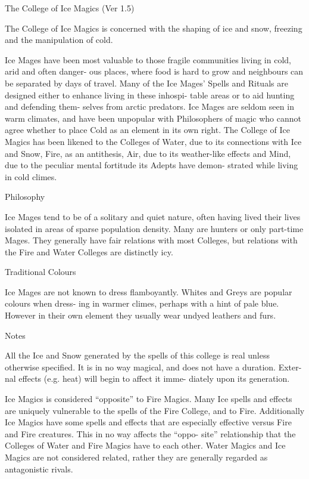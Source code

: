\begin{Chapter}{The College of Ice Magics (Ver 1.5)}

The College of Ice Magics is concerned with the shaping of ice and
snow, freezing and the manipulation of cold.

Ice Mages have been most valuable to those fragile 
communities living in cold, arid and often danger-
ous  places,  where  food  is  hard  to  grow  and 
neighbours  can  be  separated  by  days  of  travel. 
Many  of  the  Ice  Mages’  Spells  and  Rituals  are 
designed either to enhance living in these inhospi-
table  areas  or  to  aid  hunting  and  defending  them-
selves from arctic predators. Ice Mages are seldom 
seen  in  warm  climates,  and  have  been  unpopular 
with  Philosophers  of  magic  who  cannot  agree 
whether  to  place  Cold  as  an  element  in  its  own 
right.  The  College  of  Ice  Magics has  been  likened 
to  the  Colleges  of  Water,  due  to  its  connections 
with  Ice and Snow,  Fire, as an antithesis, Air, due 
to  its  weather-like  effects  and  Mind,  due  to  the 
peculiar  mental  fortitude  its  Adepts  have  demon-
strated while living in cold climes. 

Philosophy 

Ice Mages tend to be of a solitary and quiet nature, 
often  having  lived  their  lives  isolated  in  areas  of 
sparse  population  density.  Many  are  hunters  or 
only  part-time  Mages.  They  generally  have  fair 
relations with most Colleges, but relations with the 
Fire and Water Colleges are distinctly icy. 

Traditional Colours 

Ice  Mages  are  not  known  to  dress  flamboyantly. 
Whites and Greys are popular colours when dress-
ing  in  warmer  climes,  perhaps  with  a  hint  of  pale 
blue.  However  in  their  own  element  they  usually 
wear undyed leathers and furs. 

Notes 

All the Ice and Snow generated by the spells of this 
college is real unless otherwise specified. It is in no 
way magical, and does not have a duration. Exter-
nal effects (e.g. heat) will begin to affect it imme-
diately upon its generation. 

Ice  Magics  is  considered  “opposite”  to  Fire 
Magics.  Many  Ice  spells  and  effects  are  uniquely 
vulnerable to the spells of the Fire College, and to 
Fire. Additionally Ice Magics have some spells and 
effects that are especially effective versus Fire and 
Fire  creatures.  This  in  no  way  affects  the  “oppo-
site”  relationship  that  the  Colleges  of  Water  and 
Fire Magics have to each other. Water Magics and 
Ice  Magics  are  not  considered  related,  rather  they 
are generally regarded as antagonistic rivals. 


\end{Chapter}
